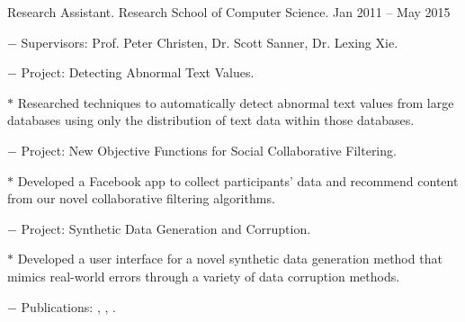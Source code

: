 \documentclass[10pt]{article}
\newcommand{\halfblankline}{\quad\vspace{-0.5\baselineskip}\pagebreak[3]}
\begin{document}
\begin{innerlist}
	\halfblankline

	\item Research Assistant. Research School of Computer Science. \hfill {Jan 2011 -- May 2015}
	\begin{innerlist}
		\item[$-$] Supervisors: Prof. Peter Christen, Dr. Scott Sanner, Dr. Lexing Xie.
		\item[$-$] Project: Detecting Abnormal Text Values.
		\begin{innerlist}
			\item[$*$] Researched techniques to automatically detect abnormal text values from large databases using only the distribution of text data within those databases.
		\end{innerlist}
		\item[$-$] Project: New Objective Functions for Social Collaborative Filtering.
		\begin{innerlist}
			\item[$*$] Developed a Facebook app to collect participants' data and recommend content from our novel collaborative filtering algorithms. %
		\end{innerlist}
		\item[$-$] Project: Synthetic Data Generation and Corruption.
		\begin{innerlist}
			\item[$*$] Developed a user interface for a novel synthetic data generation method that mimics real-world errors through a variety of data corruption methods.
		\end{innerlist}
		\item[$-$] Publications: \cite{Christen2016}, \cite{Noel2012}, \cite{Tran2013b}.
	\end{innerlist}


\end{innerlist}
\end{document}
